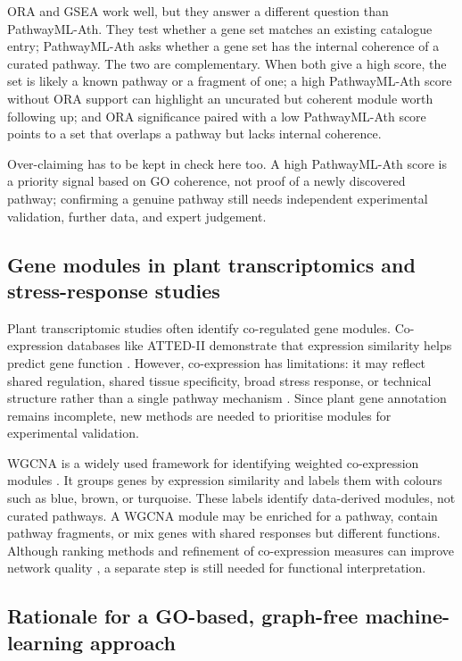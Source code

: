 \documentclass[12pt,twoside]{article}
\begin{document}
ORA and GSEA work well, but they answer a different question than PathwayML-Ath. They test whether a gene set matches an existing catalogue entry; PathwayML-Ath asks whether a gene set has the internal coherence of a curated pathway. The two are complementary. When both give a high score, the set is likely a known pathway or a fragment of one; a high PathwayML-Ath score without ORA support can highlight an uncurated but coherent module worth following up; and ORA significance paired with a low PathwayML-Ath score points to a set that overlaps a pathway but lacks internal coherence.

Over-claiming has to be kept in check here too. A high PathwayML-Ath score is a priority signal based on GO coherence, not proof of a newly discovered pathway; confirming a genuine pathway still needs independent experimental validation, further data, and expert judgement.

\subsection{Gene modules in plant transcriptomics and stress-response studies}
\label{sec:bg_plant_modules}

Plant transcriptomic studies often identify co-regulated gene modules. Co-expression databases like ATTED-II demonstrate that expression similarity helps predict gene function \citep{obayashi2018atted}. However, co-expression has limitations: it may reflect shared regulation, shared tissue specificity, broad stress response, or technical structure rather than a single pathway mechanism \citep{usadel2009coexpression}. Since plant gene annotation remains incomplete, new methods are needed to prioritise modules for experimental validation.

WGCNA is a widely used framework for identifying weighted co-expression modules \citep{langfelder2008wgcna}. It groups genes by expression similarity and labels them with colours such as blue, brown, or turquoise. These labels identify data-derived modules, not curated pathways. A WGCNA module may be enriched for a pathway, contain pathway fragments, or mix genes with shared responses but different functions. Although ranking methods and refinement of co-expression measures can improve network quality \citep{liesecke2018ranking}, a separate step is still needed for functional interpretation.
\subsection{Rationale for a GO-based, graph-free machine-learning approach}
\label{sec:bg_go_graphfree}
\end{document}
